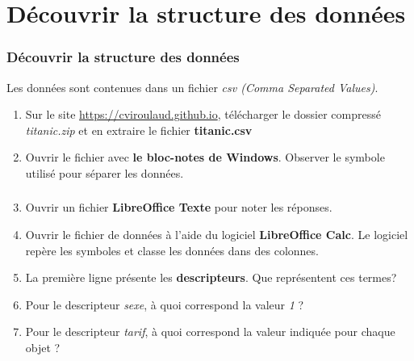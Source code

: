 \documentclass[svgnames,11pt]{beamer}
\begin{document}
\section{Découvrir la structure des données}
\begin{frame}
    \frametitle{Découvrir la structure des données}
    Les données sont contenues dans un fichier \emph{csv (Comma Separated Values)}.
    \begin{activite}
        \begin{enumerate}
            \item Sur le site \url{https://cviroulaud.github.io}, télécharger le dossier compressé \emph{titanic.zip} et en extraire le fichier \textbf{titanic.csv}
            \item Ouvrir le fichier avec \textbf{le bloc-notes de Windows}. Observer le symbole utilisé pour séparer les données.
        \end{enumerate}
    \end{activite}

\end{frame}
\begin{frame}
    \frametitle{}
    \setcounter{compteuractivite}{0}
    \begin{activite}
        \begin{enumerate}
            \setcounter{enumi}{2}
            \item Ouvrir un fichier \textbf{LibreOffice Texte} pour noter les réponses.
            \item Ouvrir le fichier de données à l'aide du logiciel \textbf{LibreOffice Calc}. Le logiciel repère les symboles et classe les données dans des colonnes.
            \item La première ligne présente les \textbf{descripteurs}. Que représentent ces termes?
            \item Pour le descripteur \emph{sexe}, à quoi correspond la valeur \emph{1} ?
            \item Pour le descripteur \emph{tarif}, à quoi correspond la valeur indiquée pour chaque objet ?
        \end{enumerate}
    \end{activite}

\end{frame}
\end{document}
